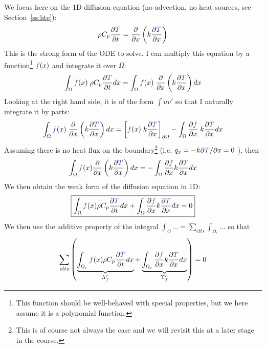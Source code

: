 We focus here on the 1D diffusion equation (no advection, no heat sources, see Section~\ref{ss:hte}):
\begin{equation}
\rho C_p \frac{\partial {\color{Violet}T}}{\partial t} 
= \frac{\partial }{\partial x} \left( k \frac{\partial {\color{Violet}T}}{\partial x}  \right)
\end{equation}
This is the {\color{olive}strong form} of the ODE to solve. 
I can multiply this equation by a function\footnote{This function should be well-behaved with 
special properties, but we here assume it is a polynomial function.} ${\color{Violet}f}(x)$ 
and integrate it over $\Omega$:
\begin{equation}
\int_{\Omega} {\color{Violet}f}(x) \;  \rho C_p\frac{\partial {\color{Violet}T}}{\partial t} dx
=
\int_{\Omega} {\color{Violet}f}(x) \;  \frac{\partial }{\partial x} \left( k \frac{\partial {\color{Violet}T}}{\partial x}  \right) dx
\end{equation}
Looking at the right hand side, it is of the form $\int u v'$ so that I naturally 
integrate it by parts:
\begin{equation}
\int_{\Omega} {\color{Violet}f}(x) \;  \frac{\partial }{\partial x} 
\left( k \frac{\partial {\color{Violet}T}}{\partial x}  \right) dx
=
\left[
 {\color{Violet}f}(x) \;  k \frac{\partial {\color{Violet}T}}{\partial x}
\right]_{\partial \Omega}
-
\int_{\Omega} \frac{\partial {\color{Violet}f}}{\partial x} \;   k \frac{\partial {\color{Violet}T}}{\partial x}  dx
\end{equation}
Assuming there is no heat flux on the boundary\footnote{This is of course not always the case
and we will revisit this at a later stage in the course.} (i.e. $q_x= - k \partial {\color{Violet}T}/\partial x = 0$ ), then
\begin{equation}
\int_{\Omega} {\color{Violet}f}(x) \frac{\partial }{\partial x} \left( k \frac{\partial {\color{Violet}T}}{\partial x}  
\right) dx
=
- \int_{\Omega} \frac{\partial {\color{Violet}f}}{\partial x}  k \frac{\partial {\color{Violet}T}}{\partial x}  dx
\end{equation}
We then obtain the {\color{olive}weak form} of the diffusion equation in 1D:
\begin{equation}
\boxed{
\int_{\Omega} {\color{Violet}f}(x) \rho C_p \frac{\partial {\color{Violet}T}}{\partial t} dx
+
\int_{\Omega} \frac{\partial {\color{Violet}f}}{\partial x}  k \frac{\partial {\color{Violet}T}}{\partial x}  dx = 0
}
\end{equation}
We then use the additive property of the integral 
$\int_\Omega \dots = \sum_{elts} \int_{\Omega_e} \dots$
so that 
\begin{equation}
\sum_{elts} \left(     
\underbrace{ \int_{\Omega_e} {\color{Violet}f}(x) \rho C_p   \frac{\partial {\color{Violet}T}}{\partial t} dx }_{{\Lambda}_f^e}
+
\underbrace{\int_{\Omega_e} \frac{\partial {\color{Violet}f}}{\partial x}  k \frac{\partial {\color{Violet}T}}{\partial x}  dx}_{{\Upsilon}_f^e}      \right) = 0  
\end{equation}


